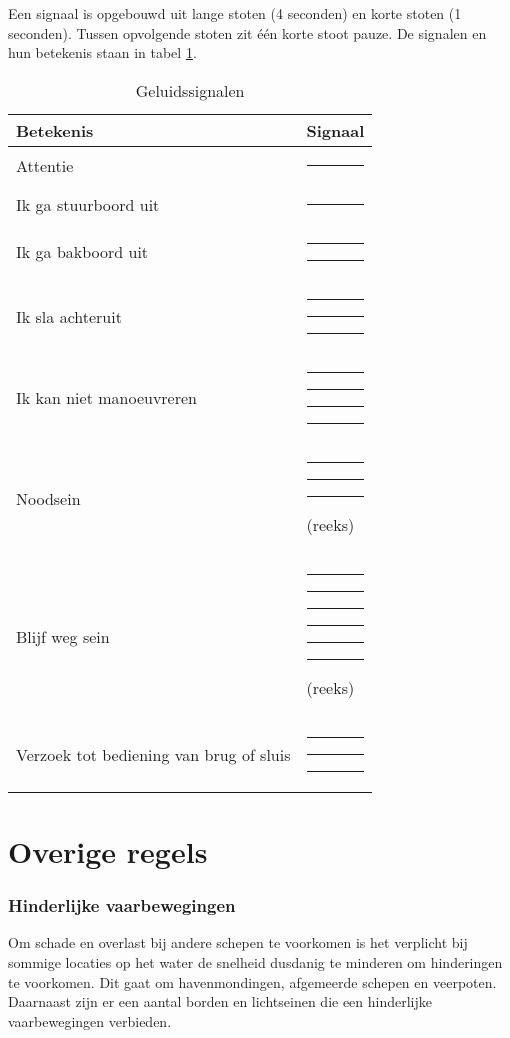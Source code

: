 Een signaal is opgebouwd uit lange stoten (4 seconden) en korte stoten (1 seconden). Tussen opvolgende stoten zit één korte stoot pauze. De signalen en hun betekenis staan in tabel \ref{tab:geluid}.

\newcommand{\sshort}{\rule{2mm}{2mm}} %
\newcommand{\slong}{\rule{6mm}{2mm}}  %
\newcommand{\sspace}{\hspace{2mm}}  %


\begin{table}[h]
	\centering
	\caption{Geluidssignalen}
	\label{tab:geluid}
	\begin{tabular}{l|l}
		\textbf{Betekenis} & \textbf{Signaal} \\ \hline
		Attentie & \slong  \\
		Ik ga stuurboord uit & \sshort \\
		Ik ga bakboord uit & \sshort \sspace \sshort \\
		Ik sla achteruit & \sshort \sspace \sshort \sspace \sshort \\
		Ik kan niet manoeuvreren & \sshort \sspace \sshort \sspace \sshort \sspace \sshort \\
		Noodsein & \slong \sspace  \slong \sspace  \slong \sspace (reeks)  \\
		Blijf weg sein\footnotemark & \sshort \sspace \slong \sspace \sshort \sspace \slong \sspace  \sshort \sspace \slong \sspace (reeks)  \\
		Verzoek tot bediening van brug of sluis & \slong \sspace  \sshort \sspace  \slong
	\end{tabular}
\end{table}


\section{Overige regels}
\subsubsection*{Hinderlijke vaarbewegingen}
Om schade en overlast bij andere schepen te voorkomen is het verplicht bij sommige locaties op het water de snelheid dusdanig te minderen om hinderingen te voorkomen. Dit gaat om havenmondingen, afgemeerde schepen en veerpoten. Daarnaast zijn er een aantal borden en lichtseinen die een hinderlijke vaarbewegingen verbieden.



